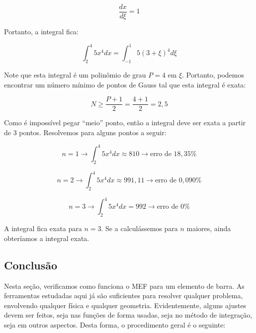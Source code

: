        \begin{equation*}
            \frac{dx}{d\xi} = 1
        \end{equation*}

        Portanto, a integral fica:

        \begin{equation*}
            \int_{2}^{4} 5x^4 dx = \int_{-1}^{1} 5\left(3+\xi\right)^4 d\xi
        \end{equation*}


        Note que esta integral é um polinômio de grau $P=4$ em $\xi$. Portanto, podemos encontrar um número mínimo de pontos de Gauss tal que esta integral é exata:

        \begin{equation*}
            N \geq \frac{P+1}{2} = \frac{4+1}{2} = 2,5
        \end{equation*}

        Como é impossível pegar ``meio'' ponto, então a integral deve ser exata a partir de $3$ pontos. Resolvemos para alguns pontos a seguir:

        \begin{equation*}
            n = 1 \rightarrow \int_{2}^{4} 5x^4 dx \approx 810 \rightarrow \text{erro de } 18,35\% 
        \end{equation*}

        \begin{equation*}
            n = 2 \rightarrow \int_{2}^{4} 5x^4 dx \approx 991,11 \rightarrow \text{erro de } 0,090\% 
        \end{equation*}

        \begin{equation*}
            n = 3 \rightarrow \int_{2}^{4} 5x^4 dx = 992 \rightarrow \text{erro de } 0\% 
        \end{equation*}

        A integral fica exata para $n=3$. Se a calculássemos para $n$ maiores, ainda obteríamos a integral exata.


\subsection{Conclusão}

    Nesta seção, verificamos como funciona o MEF para um elemento de barra. As ferramentas estudadas aqui já são suficientes para resolver qualquer problema, envolvendo qualquer física e qualquer geometria. Evidentemente, alguns ajustes devem ser feitos, seja nas funções de forma usadas, seja no método de integração, seja em outros aspectos. Desta forma, o procedimento geral é o seguinte:

